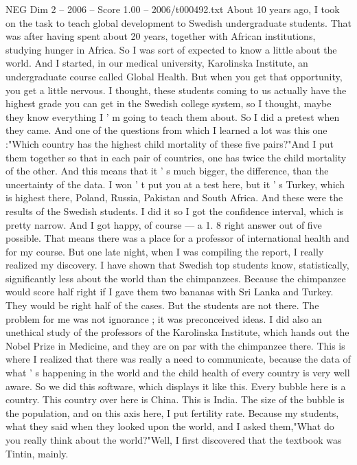 \begin{textsample}{NEG Dim 2 – 2006 – Score 1.00 – 2006/t000492.txt}  \label{ex:f2_neg_012}
About 10 years ago, I took on the task to teach global development to Swedish undergraduate students.
That was after having spent about 20 years, together with African institutions, studying hunger in Africa.
So I was sort of expected to know a little about the world.
And I started, in our medical university, Karolinska Institute, an undergraduate course called Global Health.
But when you get that opportunity, you get a little nervous.
I thought, these students coming to us actually have the highest grade you can get in the Swedish college system, so I thought, maybe they know everything I ' m going to teach them about.
So I did a pretest when they came.
And one of the questions from which I learned a lot was this one :"Which country has the highest child mortality of these five pairs?"And I put them together so that in each pair of countries, one has twice the child mortality of the other.
And this means that it ' s much bigger, the difference, than the uncertainty of the data.
I won ' t put you at a test here, but it ' s Turkey, which is highest there, Poland, Russia, Pakistan and South Africa.
And these were the results of the Swedish students.
I did it so I got the confidence interval, which is pretty narrow.
And I got happy, of course — a 1. 8 right answer out of five possible.
That means there was a place for a professor of international health and for my course.
But one late night, when I was compiling the report, I really realized my discovery.
I have shown that Swedish top students know, statistically, significantly less about the world than the chimpanzees.
Because the chimpanzee would score half right if I gave them two bananas with Sri Lanka and Turkey.
They would be right half of the cases.
But the students are not there.
The problem for me was not ignorance ; it was preconceived ideas.
I did also an unethical study of the professors of the Karolinska Institute, which hands out the Nobel Prize in Medicine, and they are on par with the chimpanzee there.
This is where I realized that there was really a need to communicate, because the data of what ' s happening in the world and the child health of every country is very well aware.
So we did this software, which displays it like this.
Every bubble here is a country.
This country over here is China.
This is India.
The size of the bubble is the population, and on this axis here, I put fertility rate.
Because my students, what they said when they looked upon the world, and I asked them,"What do you really think about the world?"Well, I first discovered that the textbook was Tintin, mainly.

\end{textsample}
